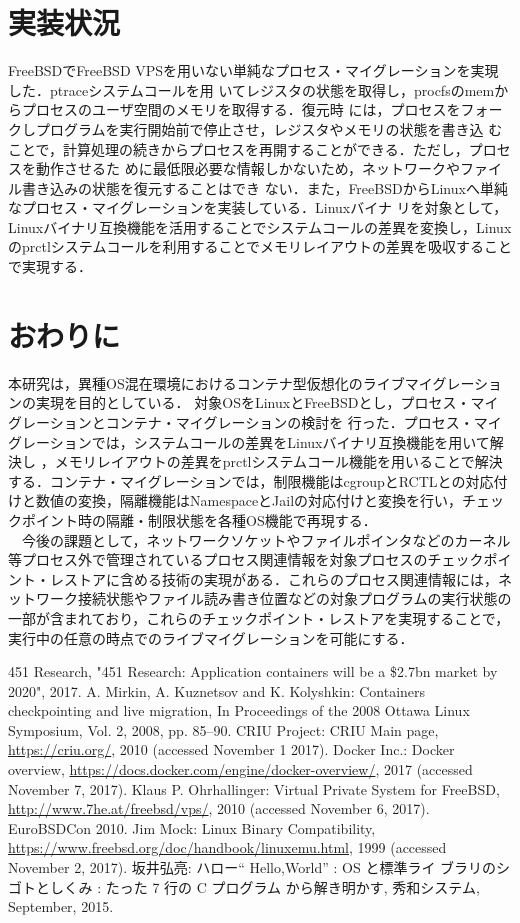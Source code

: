 \documentclass[10pt]{jarticle}
\begin{document}
\section{実装状況}
FreeBSDでFreeBSD VPSを用いない単純なプロセス・マイグレーションを実現した．ptraceシステムコールを用
いてレジスタの状態を取得し，procfsのmemからプロセスのユーザ空間のメモリを取得する．復元時
には，プロセスをフォークしプログラムを実行開始前で停止させ，レジスタやメモリの状態を書き込
むことで，計算処理の続きからプロセスを再開することができる．ただし，プロセスを動作させるた
めに最低限必要な情報しかないため，ネットワークやファイル書き込みの状態を復元することはでき
ない．また，FreeBSDからLinuxへ単純なプロセス・マイグレーションを実装している．Linuxバイナ
リを対象として，Linuxバイナリ互換機能を活用することでシステムコールの差異を変換し，Linux
のprctlシステムコールを利用することでメモリレイアウトの差異を吸収することで実現する．

\section{おわりに}
本研究は，異種OS混在環境におけるコンテナ型仮想化のライブマイグレーションの実現を目的としている．
対象OSをLinuxとFreeBSDとし，プロセス・マイグレーションとコンテナ・マイグレーションの検討を
行った．プロセス・マイグレーションでは，システムコールの差異をLinuxバイナリ互換機能を用いて解決し
，メモリレイアウトの差異をprctlシステムコール機能を用いることで解決する．コンテナ・マイグレーションでは，制限機能はcgroupとRCTLとの対応付けと数値の変換，隔離機能はNamespaceとJailの対応付けと変換を行い，チェックポイント時の隔離・制限状態を各種OS機能で再現する．\\
　今後の課題として，ネットワークソケットやファイルポインタなどのカーネル等プロセス外で管理されているプロセス関連情報を対象プロセスのチェックポイント・レストアに含める技術の実現がある．これらのプロセス関連情報には，ネットワーク接続状態やファイル読み書き位置などの対象プログラムの実行状態の一部が含まれており，これらのチェックポイント・レストアを実現することで，実行中の任意の時点でのライブマイグレーションを可能にする．



\begin{thebibliography}{99}
	451 Research, "451 Research: Application containers will be a \$2.7bn market by 2020", 2017.
  A. Mirkin, A. Kuznetsov and K. Kolyshkin: Containers checkpointing and live migration, In Proceedings of the 2008 Ottawa Linux Symposium, Vol. 2, 2008, pp. 85–90.
	CRIU Project: CRIU Main page, \url{https://criu.org/}, 2010 (accessed November 1 2017).
Docker Inc.: Docker overview, \url{https://docs.docker.com/engine/docker-overview/}, 2017 (accessed November 7, 2017).
Klaus P. Ohrhallinger: Virtual Private System for FreeBSD, \url{http://www.7he.at/freebsd/vps/}, 2010 (accessed November 6, 2017). EuroBSDCon 2010.
Jim Mock: Linux Binary Compatibility, \url{https://www.freebsd.org/doc/handbook/linuxemu.html}, 1999 (accessed November 2, 2017).
坂井弘亮: ハロー“ Hello,World” : OS と標準ライ ブラリのシゴトとしくみ : たった 7 行の C プログラム から解き明かす, 秀和システム, September, 2015.
\end{thebibliography}
\end{document}
